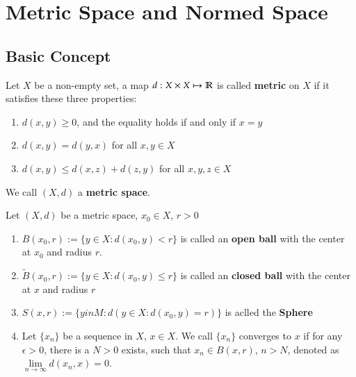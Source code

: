 \section{Metric Space and Normed Space}\label{sec:ch1}

\subsection{Basic Concept}\label{sec:ch1_1}

\begin{definition}\label{def:1.1}
Let $X$ be a non-empty set, a map $d: X \times X \mapsto \mathbb{R}$ is called \textbf{metric} on $X$ if it satisfies these three properties:
\begin{enumerate}[itemsep=0pt, topsep=0pt]
    \item $d(x, y) \geq 0$, and the equality holds if and only if  $x = y$
    \item $d(x, y) = d(y, x)$ for all $x, y \in X$
    \item $d(x, y) \leq d(x, z) + d(z, y)$ for all $x, y, z \in X$
\end{enumerate}

We call $(X, d)$ a \textbf{metric space}.
\end{definition}

\begin{definition}\label{def:1.2}
Let $(X, d)$ be a metric space, $x_0 \in X$, $r > 0$
\begin{enumerate}[itemsep=0pt, topsep=0pt]
    \item $B(x_0, r):=\{y \in X: d(x_0, y) < r\}$ is called an \textbf{open ball} with the center at $x_0$ and radius $r$. 
    \item $\tilde{B}(x_0, r):=\{y \in X: d(x_0, y) \leq r\}$ is called an \textbf{closed ball} with the center at $x$ and radius $r$
    \item $S(x, r):= \{y in M: d(y \in X: d(x_0, y) = r)\}$ is aclled the \textbf{Sphere}
    \item Let $\{x_n\}$ be a sequence in $X$, $x \in X$. We call $\{x_n\}$ converges to $x$ if for       any $\epsilon > 0$, there is a $N > 0$ exists, such that $x_n \in B(x, r)$, $n > N$,
    denoted as $\lim\limits_{n\to\infty}d(x_n ,x) = 0$.
 \end{enumerate}
\end{definition}

